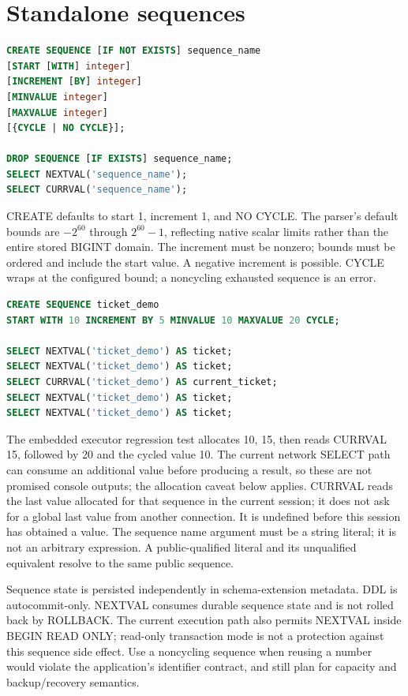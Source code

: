 \section{Standalone sequences}
\label{sql:sequences}

\begin{lstlisting}[language=SQL]
CREATE SEQUENCE [IF NOT EXISTS] sequence_name
[START [WITH] integer]
[INCREMENT [BY] integer]
[MINVALUE integer]
[MAXVALUE integer]
[{CYCLE | NO CYCLE}];

DROP SEQUENCE [IF EXISTS] sequence_name;
SELECT NEXTVAL('sequence_name');
SELECT CURRVAL('sequence_name');
\end{lstlisting}

CREATE defaults to start 1, increment 1, and NO CYCLE. The parser's default bounds are \(-2^{60}\) through \(2^{60}-1\), reflecting native scalar limits rather than the entire stored BIGINT domain. The increment must be nonzero; bounds must be ordered and include the start value. A negative increment is possible. CYCLE wraps at the configured bound; a noncycling exhausted sequence is an error.

\begin{lstlisting}[language=SQL]
CREATE SEQUENCE ticket_demo
START WITH 10 INCREMENT BY 5 MINVALUE 10 MAXVALUE 20 CYCLE;

SELECT NEXTVAL('ticket_demo') AS ticket;
SELECT NEXTVAL('ticket_demo') AS ticket;
SELECT CURRVAL('ticket_demo') AS current_ticket;
SELECT NEXTVAL('ticket_demo') AS ticket;
SELECT NEXTVAL('ticket_demo') AS ticket;
\end{lstlisting}

The embedded executor regression test allocates 10, 15, then reads CURRVAL 15, followed by 20 and the cycled value 10. The current network SELECT path can consume an additional value before producing a result, so these are not promised console outputs; the allocation caveat below applies. CURRVAL reads the last value allocated for that sequence in the current session; it does not ask for a global last value from another connection. It is undefined before this session has obtained a value. The sequence name argument must be a string literal; it is not an arbitrary expression. A public-qualified literal and its unqualified equivalent resolve to the same public sequence.

Sequence state is persisted independently in schema-extension metadata. DDL is autocommit-only. NEXTVAL consumes durable sequence state and is not rolled back by ROLLBACK. The current execution path also permits NEXTVAL inside BEGIN READ ONLY; read-only transaction mode is not a protection against this sequence side effect. Use a noncycling sequence when reusing a number would violate the application's identifier contract, and still plan for capacity and backup/recovery semantics.


